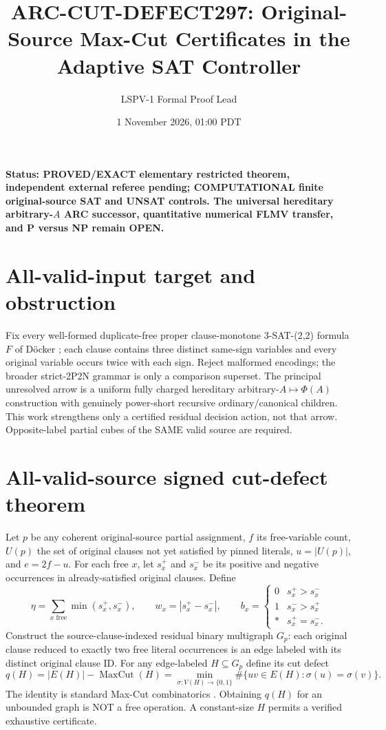 \documentclass[11pt]{article}
\title{ARC-CUT-DEFECT297: Original-Source Max-Cut Certificates in the Adaptive SAT Controller}
\author{LSPV-1 Formal Proof Lead}
\date{1 November 2026, 01:00 PDT}
\begin{document}
\maketitle
\noindent\textbf{Status: PROVED/EXACT elementary restricted theorem, independent external referee pending; COMPUTATIONAL finite original-source SAT and UNSAT controls. The universal hereditary arbitrary-$A$ ARC successor, quantitative numerical FLMV transfer, and P versus NP remain OPEN.}
\section{All-valid-input target and obstruction}
Fix every well-formed duplicate-free proper clause-monotone 3-SAT-(2,2) formula $F$ of D\"ocker \cite{doecker2019}; each clause contains three distinct same-sign variables and every original variable occurs twice with each sign. Reject malformed encodings; the broader strict-2P2N grammar is only a comparison superset. The principal unresolved arrow is a uniform fully charged hereditary arbitrary-$A\mapsto\Phi(A)$ construction with genuinely power-short recursive ordinary/canonical children. This work strengthens only a certified residual decision action, not that arrow. Opposite-label partial cubes of the SAME valid source are required.

\section{All-valid-source signed cut-defect theorem}
Let $p$ be any coherent original-source partial assignment, $f$ its free-variable count, $U(p)$ the set of original clauses not yet satisfied by pinned literals, $u=|U(p)|$, and $e=2f-u$. For each free $x$, let $s_x^+$ and $s_x^-$ be its positive and negative occurrences in already-satisfied original clauses. Define
\[
\eta=\sum_{x\text{ free}}\min(s_x^+,s_x^-),\qquad
w_x=|s_x^+-s_x^-|,\qquad
b_x=\begin{cases}0&s_x^+>s_x^-\\1&s_x^->s_x^+\\ *&s_x^+=s_x^-.\end{cases}
\]
Construct the source-clause-indexed residual binary multigraph $G_p$: each original clause reduced to exactly two free literal occurrences is an edge labeled with its distinct original clause ID. For any edge-labeled $H\subseteq G_p$ define its cut defect
\[
q(H)=|E(H)|-\operatorname{MaxCut}(H)
=\min_{\sigma:V(H)\to\{0,1\}}\#\{uv\in E(H):\sigma(u)=\sigma(v)\}.
\]
The identity is standard Max-Cut combinatorics \cite{goemans1995}. Obtaining $q(H)$ for an unbounded graph is NOT a free operation. A constant-size $H$ permits a verified exhaustive certificate.
\end{document}
